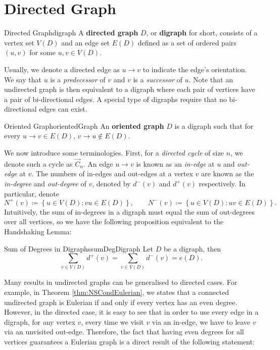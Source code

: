 \documentclass[math]{amznotes}
\theoremstyle{remark}
\newcommand{\0}{\mathbf{0}}
\newcommand{\1}{\mathbf{1}}
\begin{document}
\section{Directed Graph}
\begin{dfnbox}{Directed Graph}{digraph}
    A {\color{red} \textbf{directed graph}} $D$, or {\color{red} \textbf{digraph}} for short, consists of a vertex set $V(D)$ and an edge set $E(D)$ defined as a set of ordered pairs $(u, v)$ for some $u, v \in V(D)$.
\end{dfnbox}
Usually, we denote a directed edge as $u \to v$ to indicate the edge's orientation. We say that $u$ is a \textit{predecessor} of $v$ and $v$ is a \textit{successor} of $u$. Note that an undirected graph is then equivalent to a digraph where each pair of vertices have a pair of bi-directional edges. A special type of digraphs require that no bi-directional edges can exist.
\begin{dfnbox}{Oriented Graph}{orientedGraph}
    An {\color{red} \textbf{oriented graph}} $D$ is a digraph such that for every $u \to v \in E(D)$, $v \to u \notin E(D)$.
\end{dfnbox}
We now introduce some terminologies. First, for a \textit{directed cycle} of size $n$, we denote such a cycle as $\overrightarrow{C}_n$. An edge $u \to v$ is known as an \textit{in-edge} at $u$ and \textit{out-edge} at $v$. The numbers of in-edges and out-edges at a vertex $v$ are known as the \textit{in-degree} and \textit{out-degree} of $v$, denoted by $d^-(v)$ and $d^+(v)$ respectively. In particular, denote 
\begin{equation*}
    N^+(v) \coloneqq \left\{u \in V(D) \colon vu \in E(D)\right\}, \qquad N^-(v) \coloneqq \left\{u \in V(D) \colon uv \in E(D)\right\}.
\end{equation*}
Intuitively, the sum of in-degrees in a digraph must equal the sum of out-degrees over all vertices, so we have the following proposition equivalent to the Handshaking Lemma:
\begin{probox}{Sum of Degrees in Digraphs}{sumDegDigraph}
    Let $D$ be a digraph, then 
    \begin{equation*}
        \sum_{v \in V(D)}d^+(v) = \sum_{v \in V(D)}d^-(v) = e(D).
    \end{equation*}
\end{probox}
Many results in undirected graphs can be generalised to directed cases. For example, in Theorem \ref{thm:NSCondEulerian}, we states that a connected undirected graph is Eulerian if and only if every vertex has an even degree. However, in the directed case, it is easy to see that in order to use every edge in a digraph, for any vertex $v$, every time we visit $v$ via an in-edge, we have to leave $v$ via an unvisited out-edge. Therefore, the fact that having even degrees for all vertices guarantees a Eulerian graph is a direct result of the following statement:
\end{document}
